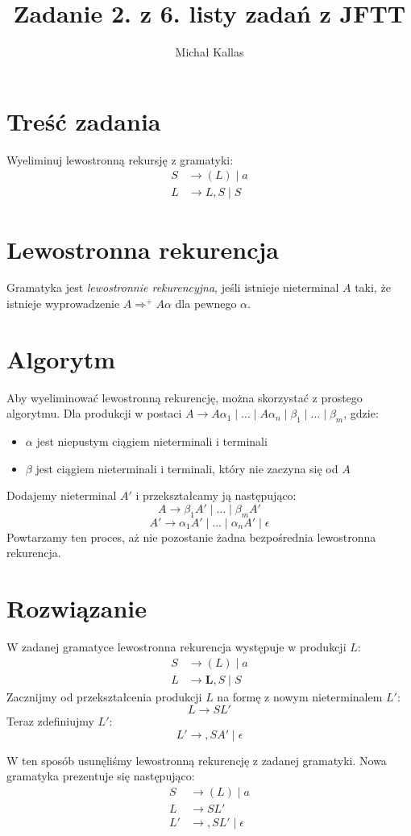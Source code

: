 \documentclass{article}
\title{Zadanie 2. z 6. listy zadań z JFTT}
\author{Michał Kallas}
\begin{document}
\maketitle

\section{Treść zadania}
Wyeliminuj lewostronną rekursję z gramatyki:
$$
\begin{aligned}
S &\to (L) \mid a \\
L &\to L, S \mid S
\end{aligned}
$$

\section{Lewostronna rekurencja}
Gramatyka jest \emph{lewostronnie rekurencyjna}, jeśli istnieje nieterminal $A$ taki, że istnieje wyprowadzenie $A \Rightarrow^+ A\alpha$ dla pewnego $\alpha$.

\section{Algorytm}
Aby wyeliminować lewostronną rekurencję, można skorzystać z prostego algorytmu.
Dla produkcji w postaci
${\displaystyle A \rightarrow A\alpha_1 \mid \ldots \mid A\alpha_n \mid \beta_1 \mid \ldots \mid \beta_m}$, gdzie:

\begin{itemize}
    \item $\alpha$ jest niepustym ciągiem nieterminali i terminali
    \item $\beta$ jest ciągiem nieterminali i terminali, który nie zaczyna się od $A$
\end{itemize}

Dodajemy nieterminal $A'$ i przekształcamy ją następująco:
$$
A \rightarrow \beta_1A' \mid \ldots \mid \beta_mA'
$$
$$
A' \rightarrow \alpha_1A' \mid \ldots \mid \alpha_nA' \mid \epsilon
$$
Powtarzamy ten proces, aż nie pozostanie żadna bezpośrednia lewostronna rekurencja.

\section{Rozwiązanie}
W zadanej gramatyce lewostronna rekurencja występuje w produkcji $L$:
$$
\begin{aligned}
S &\to (L) \mid a \\
L &\to \boldsymbol{L}, S \mid S
\end{aligned}
$$
Zacznijmy od przekształcenia produkcji $L$ na formę z nowym nieterminalem $L'$:
$$
L \rightarrow SL'
$$
Teraz zdefiniujmy $L'$:
$$
L' \rightarrow ,SA' \mid \epsilon
$$

W ten sposób usunęliśmy lewostronną rekurencję z zadanej gramatyki.
Nowa gramatyka prezentuje się następująco:
$$
\begin{aligned}
S &\to (L) \mid a \\
L &\to SL' \\
L' &\to ,SL' \mid \epsilon
\end{aligned}
$$
\end{document}
